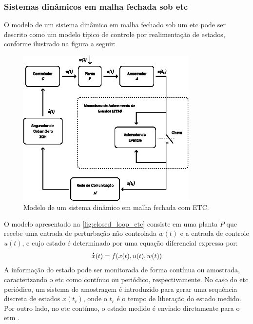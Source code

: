 \subsubsection{Sistemas dinâmicos em malha fechada sob \acrshort{etc}}
O modelo de um sistema dinâmico em malha fechado sob um \acrshort{etc} pode ser descrito como um modelo típico de controle por realimentação de estados, conforme ilustrado na figura a seguir:

\begin{figure}[H]
  \centering
  \includegraphics[width=0.8\textwidth]{figuras/etc-model.eps}
  \caption{Modelo de um sistema dinâmico em malha fechada com ETC.}
  \label{fig:closed_loop_etc}
\end{figure}

O modelo apresentado na \autoref{fig:closed_loop_etc} consiste em uma planta $P$ que recebe uma entrada de perturbação não controlada $w(t)$ e a entrada de controle $u(t)$, e cujo estado é determinado por uma equação diferencial expressa por: \begin{equation}\dt{x}(t) = f(x(t), u(t), w(t))\end{equation} A informação do estado pode ser monitorada de forma contínua ou amostrada, caracterizando o \acrshort{etc} como contínuo ou periódico, respectivamente. No caso do \acrshort{etc} periódico, um sistema de amostragem é introduzido para gerar uma sequência discreta de estados $x(t_r)$, onde o $t_r$ é o tempo de liberação do estado medido. Por outro lado, no \acrshort{etc} contínuo, o estado medido é enviado diretamente para o \acrshort{etm} \citep{peng2018,coutinho2021,Lemmon2010}.

